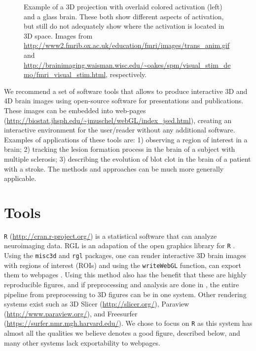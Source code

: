\documentclass[final]{beamer}\usepackage[]{graphicx}\usepackage[]{color}
\begin{document}
\begin{frame}[fragile]
\begin{multicols}{2}
\begin{figure}
\begin{minipage}[b]{3.5in}
  \end{minipage}\hfill  
  \begin{minipage}[b]{7in}
    \caption{
		Example of a 3D projection with overlaid colored activation (left) and a glass brain.  These both show different aspects of activation, but still do not adequately show where the activation is located in 3D space.  {\scriptsize Images from { \url{http://www2.fmrib.ox.ac.uk/education/fmri/images/trans_anim.gif}} and { \url{http://brainimaging.waisman.wisc.edu/~oakes/spm/visual_stim_demo/fmri_visual_stim.html}}, respectively.}
    }   \label{fig:others}
 \end{minipage}
\end{figure}


We recommend a set of software tools that allows to produce interactive 3D and 4D brain images using open-source software for presentations and publications. These images can be embedded into web-pages (\url{http://biostat.jhsph.edu/~jmuschel/webGL/index_jsed.html}), creating an interactive environment for the user/reader without any additional software. Examples of applications of these tools are: 1) observing a region of interest in a brain; 2) tracking the lesion formation process in the brain of a subject with multiple sclerosis; 3) describing the evolution of blot clot in the brain of a patient with a stroke. The methods and approaches can be much more generally applicable.

\section{Tools}
\texttt{R} (\href{http://cran.r-project.org/}{http://cran.r-project.org/}) is a statistical software that can analyze neuroimaging data.  RGL is an adapation of the open graphics library for \texttt{R} \cite{opengl}.  Using the \texttt{misc3d} and \texttt{rgl} packages, one can render interactive 3D brain images with regions of interest (ROIs) and using the \texttt{writeWebGL} function, can export them to webpages \citep{rgl, misc3d}.  Using this method also has the benefit that these are highly reproducible figures, and if preprocessing and analysis are done in , the entire pipeline from preprocessing to 3D figures can be in one system.  
Other rendering systems exist such as 3D Slicer (\href{http://slicer.org/}{http://slicer.org/}), Paraview (\href{http://www.paraview.org/}{http://www.paraview.org/}), and Freesurfer (\href{https://surfer.nmr.mgh.harvard.edu/}{https://surfer.nmr.mgh.harvard.edu/}).  We chose to focus on \texttt{R} as this system has almost all the qualities we believe denotes a good figure, described below, and many other systems lack exportability to webpages. 


\end{multicols}
\end{frame}
\end{document}
